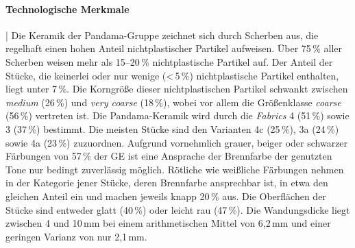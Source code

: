 \paragraph{Technologische Merkmale}\hspace{-.5em}|\hspace{.5em}%
Die Keramik der Pandama-Gruppe zeichnet sich durch Scherben aus, die regelhaft einen hohen Anteil nichtplastischer Partikel aufweisen. Über 75\,\% aller Scherben weisen mehr als 15--20\,\% nichtplastische Partikel auf. Der Anteil der Stücke, die keinerlei oder nur wenige (\textless\,5\,\%) nichtplastische Partikel enthalten, liegt unter 7\,\%. Die Korngröße dieser nichtplastischen Partikel schwankt zwischen \textit{medium} (26\,\%) und \textit{very coarse} (18\,\%), wobei vor allem die Größenklasse \textit{coarse} (56\,\%) vertreten ist. Die Pandama-Keramik wird durch die \textit{Fabrics} 4 (51\,\%) sowie 3 (37\,\%) bestimmt. Die meisten Stücke sind den Varianten 4c (25\,\%), 3a (24\,\%) sowie 4a (23\,\%) zuzuordnen. Aufgrund vornehmlich grauer, beiger oder schwarzer Färbungen von 57\,\% der GE ist eine Ansprache der Brennfarbe der genutzten Tone nur bedingt zuverlässig möglich. Rötliche wie weißliche Färbungen nehmen in der Kategorie jener Stücke, deren Brennfarbe ansprechbar ist, in etwa den gleichen Anteil ein und machen jeweils knapp 20\,\% aus. Die Oberflächen der Stücke sind entweder glatt (40\,\%) oder leicht rau (47\,\%). Die Wandungsdicke liegt zwischen 4 und 10\,mm bei einem arithmetischen Mittel von 6,2\,mm und einer geringen Varianz von nur 2,1\,mm. 


